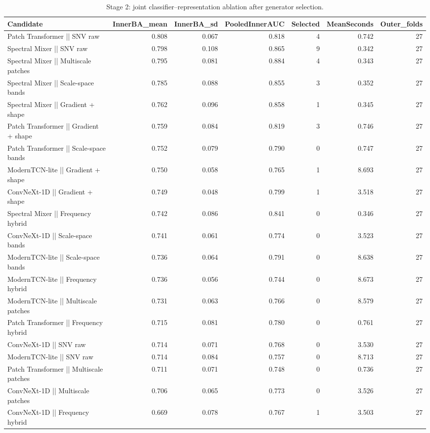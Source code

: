 \begin{table}[t]
\centering
\caption{Stage 2: joint classifier--representation ablation after generator selection.}
\footnotesize
\begin{tabular}{lrrrrrr}
\toprule
Candidate & InnerBA\_mean & InnerBA\_sd & PooledInnerAUC & Selected & MeanSeconds & Outer\_folds \\
\midrule
Patch Transformer || SNV raw & 0.808 & 0.067 & 0.818 & 4 & 0.742 & 27 \\
Spectral Mixer || SNV raw & 0.798 & 0.108 & 0.865 & 9 & 0.342 & 27 \\
Spectral Mixer || Multiscale patches & 0.795 & 0.081 & 0.884 & 4 & 0.343 & 27 \\
Spectral Mixer || Scale-space bands & 0.785 & 0.088 & 0.855 & 3 & 0.352 & 27 \\
Spectral Mixer || Gradient + shape & 0.762 & 0.096 & 0.858 & 1 & 0.345 & 27 \\
Patch Transformer || Gradient + shape & 0.759 & 0.084 & 0.819 & 3 & 0.746 & 27 \\
Patch Transformer || Scale-space bands & 0.752 & 0.079 & 0.790 & 0 & 0.747 & 27 \\
ModernTCN-lite || Gradient + shape & 0.750 & 0.058 & 0.765 & 1 & 8.693 & 27 \\
ConvNeXt-1D || Gradient + shape & 0.749 & 0.048 & 0.799 & 1 & 3.518 & 27 \\
Spectral Mixer || Frequency hybrid & 0.742 & 0.086 & 0.841 & 0 & 0.346 & 27 \\
ConvNeXt-1D || Scale-space bands & 0.741 & 0.061 & 0.774 & 0 & 3.523 & 27 \\
ModernTCN-lite || Scale-space bands & 0.736 & 0.064 & 0.791 & 0 & 8.638 & 27 \\
ModernTCN-lite || Frequency hybrid & 0.736 & 0.056 & 0.744 & 0 & 8.673 & 27 \\
ModernTCN-lite || Multiscale patches & 0.731 & 0.063 & 0.766 & 0 & 8.579 & 27 \\
Patch Transformer || Frequency hybrid & 0.715 & 0.081 & 0.780 & 0 & 0.761 & 27 \\
ConvNeXt-1D || SNV raw & 0.714 & 0.071 & 0.768 & 0 & 3.530 & 27 \\
ModernTCN-lite || SNV raw & 0.714 & 0.084 & 0.757 & 0 & 8.713 & 27 \\
Patch Transformer || Multiscale patches & 0.711 & 0.071 & 0.748 & 0 & 0.736 & 27 \\
ConvNeXt-1D || Multiscale patches & 0.706 & 0.065 & 0.773 & 0 & 3.526 & 27 \\
ConvNeXt-1D || Frequency hybrid & 0.669 & 0.078 & 0.767 & 1 & 3.503 & 27 \\
\bottomrule
\end{tabular}
\end{table}
